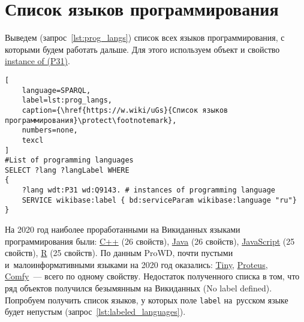 \section{Список языков программирования}
%
%
Выведем (запрос~\ref{lst:prog_langs}) список всех языков программирования, 
с которыми будем работать дальше. 
Для этого используем объект  
и свойство \href{https://www.wikidata.org/wiki/Property:P31}{instance of (P31)}.

\begin{lstlisting}[
	language=SPARQL,
	label=lst:prog_langs,
	caption={\href{https://w.wiki/uGs}{Список языков программирования}\protect\footnotemark},
    numbers=none,
	texcl 
]
#List of programming languages
SELECT ?lang ?langLabel WHERE
{
    ?lang wdt:P31 wd:Q9143. # instances of programming language
    SERVICE wikibase:label { bd:serviceParam wikibase:language "ru"}
}
\end{lstlisting}

На 2020 год наиболее проработанными на Викиданных языками программирования были: 
\href{https://www.wikidata.org/wiki/Q2407}{C++} (26 свойств), 
\href{https://www.wikidata.org/wiki/Q251}{Java} (26 свойств), 
\href{https://www.wikidata.org/wiki/Q2005}{JavaScript} (25 свойств), 
\href{https://www.wikidata.org/wiki/Q206904}{R} (25 свойств). 
По данным ProWD, 
почти пустыми и~малоинформативными языками на 2020 год оказались: %
\href{https://www.wikidata.org/wiki/Q3991643}{Tiny}, 
\href{https://www.wikidata.org/wiki/Q3924253}{Proteus}, 
\href{https://www.wikidata.org/wiki/Q21524853}{Comfy}~--- всего по одному свойству.
Недостаток полученного списка в том, 
что ряд объектов получился безымянным на Викиданных (No label defined). 
Попробуем получить список языков, у которых поле \lstinline|label| на~русском языке будет непустым (запрос~\ref{lst:labeled_languages}).




